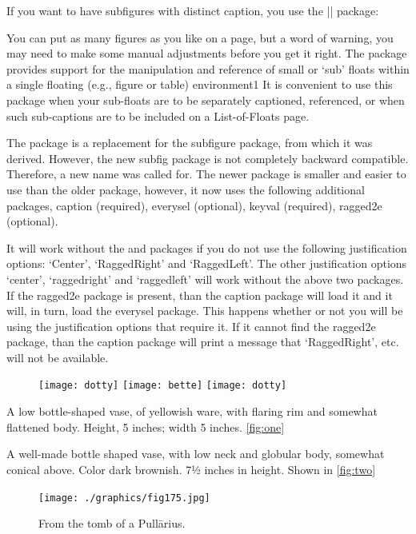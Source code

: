 If you want to have subfigures with distinct caption, you use the |\subfig| package:


You can put as many figures as you like on a page, but a word of warning, you may need to make some manual adjustments before you get it right. The package provides support for the manipulation and reference of small or ‘sub’ floats within a single floating (e.g., figure or table) environment1 It is convenient to use this
package when your sub-floats are to be separately captioned, referenced, or when such
sub-captions are to be included on a List-of-Floats page.

The package is a replacement for the subfigure package, from which it was derived.
However, the new subfig package is not completely backward compatible.
Therefore, a new name was called for. The newer package is smaller and easier to use
than the older package, however, it now uses the following additional packages, 
caption (required), 
everysel (optional), 
keyval (required), 
ragged2e (optional).

It will work without the  and  packages if you do not use the following
justification options: ‘Center’, ‘RaggedRight’ and ‘RaggedLeft’. The other justification
options ‘center’, ‘raggedright’ and ‘raggedleft’ will work without the above two packages. If the ragged2e package is present, than the caption package will load it and it
will, in turn, load the everysel package. This happens whether or not you will be using
the justification options that require it. If it cannot find the ragged2e package, than the
caption package will print a message that ‘RaggedRight’, etc. will not be available.


\begin{figure}[htb]
\texttt{[image: dotty]}
\texttt{[image: bette]}
\texttt{[image: dotty]}
\end{figure}

 A low bottle-shaped vase, of yellowish ware, with flaring rim and somewhat flattened body. Height, 5 inches; width 5 inches. \ref{fig:one}

A well-made bottle shaped vase, with low neck and globular body, somewhat conical above. Color dark brownish. 7½ inches in height. Shown in \ref{fig:two}


\begin{figure}
  \centering
  \texttt{[image: ./graphics/fig175.jpg]}
   \centerline{From the tomb of a Pull\= arius.}
  \label{fig:marginfig1}
\end{figure}

